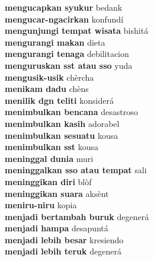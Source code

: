 \textbf{ mengucapkan syukur  } bedank \\
\textbf{ mengucar-ngacirkan  } konfundí \\
\textbf{ mengunjungi tempat wisata  } bishitá \\
\textbf{ mengurangi makan  } dieta \\
\textbf{ mengurangi tenaga  } debilitacion \\
\textbf{ menguruskan sst atau sso  } yuda \\
\textbf{ mengusik-usik  } chèrcha \\
\textbf{ menikam dadu  } chèns \\
\textbf{ menilik dgn teliti  } konsiderá \\
\textbf{ menimbulkan bencana  } desastroso \\
\textbf{ menimbulkan kasih  } adorabel \\
\textbf{ menimbulkan sesuatu  } kousa \\
\textbf{ menimbulkan sst  } kousa \\
\textbf{ meninggal dunia  } muri \\
\textbf{ meninggalkan sso atau tempat  } sali \\
\textbf{ meninggikan diri  } blòf \\
\textbf{ meninggikan suara  } aksènt \\
\textbf{ meniru-niru  } kopia \\
\textbf{ menjadi bertambah buruk  } degenerá \\
\textbf{ menjadi hampa  } desapuntá \\
\textbf{ menjadi lebih besar  } kresiendo \\
\textbf{ menjadi lebih teruk  } degenerá \\
